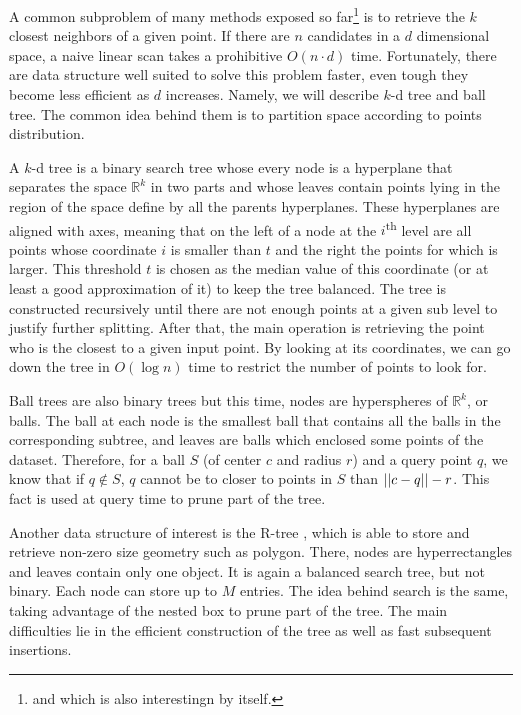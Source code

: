 A common subproblem of many methods exposed so far\footnote{and which is also
interestingn by itself.} is to retrieve the $k$ closest neighbors of a given
point. If there are $n$ candidates in a $d$ dimensional space, a naive linear
scan takes a prohibitive $O(n\cdot d)$ time.  Fortunately, there are data
structure well suited to solve this problem faster, even tough they become
less efficient as $d$ increases. Namely, we will describe $k$-d tree and ball
tree. The common idea behind them is to partition space according to points
distribution.

A $k$-d tree \autocite{kdtree75} is a binary search tree whose every node is a
hyperplane that separates the space $\mathbb{R}^k$ in two parts and whose
leaves contain points lying in the region of the space define by all the
parents hyperplanes. These hyperplanes are aligned with axes, meaning that on
the left of a node at the $i$\textsuperscript{th} level are all points whose
coordinate $i$ is smaller than $t$ and the right the points for which is
larger. This threshold $t$ is chosen as the median value of this coordinate (or
at least a good approximation of it) to keep the tree balanced. The tree is
constructed recursively until there are not enough points at a given sub level
to justify further splitting. After that, the main operation is retrieving the
point who is the closest to a given input point. By looking at its coordinates,
we can go down the tree in $O(\log n)$ time to restrict the number of points to
look for.

Ball trees \autocite{BallTree89} are also binary trees but this time, nodes are
hyperspheres of $\mathbb{R}^k$, or balls. The ball at each node is the smallest
ball that contains all the balls in the corresponding subtree, and leaves are
balls which enclosed some points of the dataset. Therefore, for a ball $S$ (of
center $c$ and radius $r$) and a query point $q$, we know that if $q \notin S$,
$q$ cannot be to closer to points in $S$ than $\left|\left|c - q\right|\right| -r$. This fact is
used at query time to prune part of the tree.

Another data structure of interest is the R-tree \autocite{Rindex84}, which is
able to store and retrieve non-zero size geometry such as polygon. There, nodes
are hyperrectangles and leaves contain only one object. It is again a balanced
search tree, but not binary. Each node can store up to $M$ entries. The idea
behind search is the same, taking advantage of the nested box to prune part of
the tree. The main difficulties lie in the efficient construction of the tree
as well as fast subsequent insertions.


